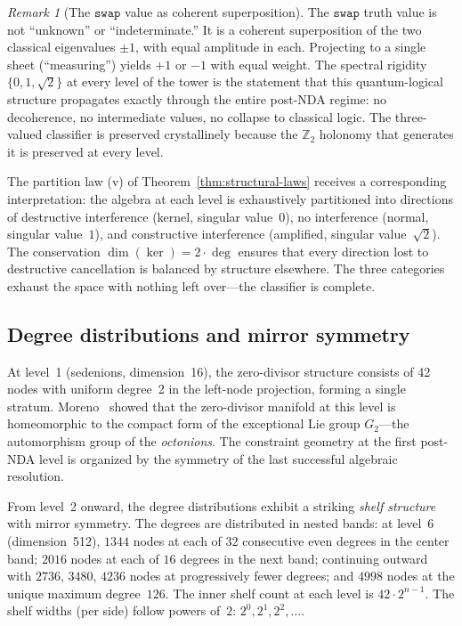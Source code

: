 \documentclass[12pt,a4paper]{article}
\theoremstyle{definition}
\theoremstyle{remark}
\newtheorem{remark}[theorem]{Remark}
\newcommand{\Z}{\mathbb{Z}}
\newcommand{\swap}{\mathtt{swap}}
\begin{document}
\begin{remark}[The $\swap$ value as coherent superposition]
\label{rem:swap-superposition}
The $\swap$ truth value is not ``unknown'' or ``indeterminate.''
It is a coherent superposition of the two classical eigenvalues
$\pm 1$, with equal amplitude in each. Projecting to a single
sheet (``measuring'') yields $+1$ or $-1$ with equal weight.
The spectral rigidity $\{0, 1, \sqrt{2}\}$ at every level of
the tower is the statement that this quantum-logical structure
propagates exactly through the entire post-NDA regime: no
decoherence, no intermediate values, no collapse to classical
logic. The three-valued classifier is preserved crystallinely
because the $\Z_2$ holonomy that generates it is preserved at
every level.
\end{remark}

The partition law (v) of Theorem~\ref{thm:structural-laws}
receives a corresponding interpretation: the algebra at each
level is exhaustively partitioned into directions of destructive
interference (kernel, singular value~$0$), no interference
(normal, singular value~$1$), and constructive interference
(amplified, singular value~$\sqrt{2}$). The conservation
$\dim(\ker) = 2 \cdot \deg$ ensures that every direction lost to
destructive cancellation is balanced by structure elsewhere. The
three categories exhaust the space with nothing left over---the
classifier is complete.

\subsection{Degree distributions and mirror symmetry}

At level~1 (sedenions, dimension~16), the zero-divisor structure
consists of 42 nodes with uniform degree~2 in the left-node
projection, forming a single stratum. Moreno~\cite{Moreno1998}
showed that the zero-divisor manifold at this level is
homeomorphic to the compact form of the exceptional Lie group
$G_2$---the automorphism group of the \emph{octonions}. The
constraint geometry at the first post-NDA level is organized by
the symmetry of the last successful algebraic resolution.

From level~2 onward, the degree distributions exhibit a striking
\emph{shelf structure} with mirror symmetry. The degrees are
distributed in nested bands: at level~6 (dimension~512), $1344$
nodes at each of $32$ consecutive even degrees in the center
band; $2016$ nodes at each of $16$ degrees in the next band;
continuing outward with $2736$, $3480$, $4236$ nodes at
progressively fewer degrees; and $4998$ nodes at the unique
maximum degree~$126$. The inner shelf count at each level is
$42 \cdot 2^{n-1}$. The shelf widths (per side) follow powers
of~$2$: $2^0, 2^1, 2^2, \ldots$.
\end{document}
